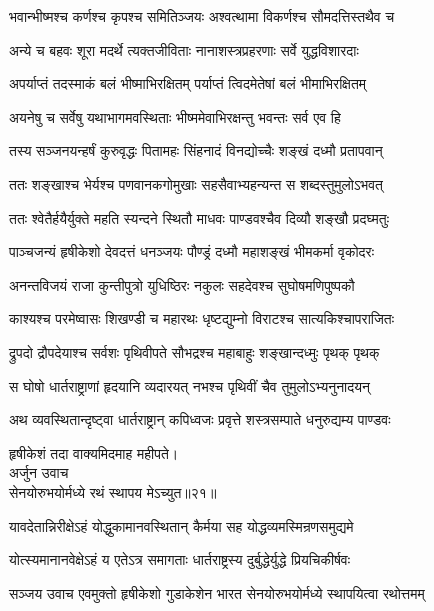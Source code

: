 \twolineshloka
{भवान्भीष्मश्च कर्णश्च कृपश्च समितिञ्जयः}
{अश्वत्थामा विकर्णश्च सौमदत्तिस्तथैव च}%

\twolineshloka
{अन्ये च बहवः शूरा मदर्थे त्यक्तजीविताः}
{नानाशस्त्रप्रहरणाः सर्वे युद्धविशारदाः}%

\twolineshloka
{अपर्याप्तं तदस्माकं बलं भीष्माभिरक्षितम्}
{पर्याप्तं त्विदमेतेषां बलं भीमाभिरक्षितम्}%

\twolineshloka
{अयनेषु च सर्वेषु यथाभागमवस्थिताः}
{भीष्ममेवाभिरक्षन्तु भवन्तः सर्व एव हि}%

\twolineshloka
{तस्य सञ्जनयन्हर्षं कुरुवृद्धः पितामहः}
{सिंहनादं विनद्योच्चैः शङ्खं दध्मौ प्रतापवान्}%

\twolineshloka
{ततः शङ्खाश्च भेर्यश्च पणवानकगोमुखाः}
{सहसैवाभ्यहन्यन्त स शब्दस्तुमुलोऽभवत्}%

\twolineshloka
{ततः श्वेतैर्हयैर्युक्ते महति स्यन्दने स्थितौ}
{माधवः पाण्डवश्चैव दिव्यौ शङ्खौ प्रदघ्मतुः}%

\twolineshloka
{पाञ्चजन्यं हृषीकेशो देवदत्तं धनञ्जयः}
{पौण्ड्रं दध्मौ महाशङ्खं भीमकर्मा वृकोदरः}%

\twolineshloka
{अनन्तविजयं राजा कुन्तीपुत्रो युधिष्ठिरः}
{नकुलः सहदेवश्च सुघोषमणिपुष्पकौ}%

\twolineshloka
{काश्यश्च परमेष्वासः शिखण्डी च महारथः}
{धृष्टद्युम्नो विराटश्च सात्यकिश्चापराजितः}%

\twolineshloka
{द्रुपदो द्रौपदेयाश्च सर्वशः पृथिवीपते}
{सौभद्रश्च महाबाहुः शङ्खान्दध्मुः पृथक् पृथक्}%

\twolineshloka
{स घोषो धार्तराष्ट्राणां हृदयानि व्यदारयत्}
{नभश्च पृथिवीं चैव तुमुलोऽभ्यनुनादयन्}%

\twolineshloka
{अथ व्यवस्थितान्दृष्ट्वा धार्तराष्ट्रान् कपिध्वजः}
{प्रवृत्ते शस्त्रसम्पाते धनुरुद्यम्य पाण्डवः}%


{हृषीकेशं तदा वाक्यमिदमाह महीपते।}\\
{अर्जुन उवाच}\\
{सेनयोरुभयोर्मध्ये रथं स्थापय मेऽच्युत॥२१॥}\\%

\twolineshloka
{यावदेतान्निरीक्षेऽहं योद्धुकामानवस्थितान्}
{कैर्मया सह योद्धव्यमस्मिन्रणसमुद्यमे}%

\twolineshloka
{योत्स्यमानानवेक्षेऽहं य एतेऽत्र समागताः}
{धार्तराष्ट्रस्य दुर्बुद्धेर्युद्धे प्रियचिकीर्षवः}%

{सञ्जय उवाच}
\twolineshloka
{एवमुक्तो हृषीकेशो गुडाकेशेन भारत}
{सेनयोरुभयोर्मध्ये स्थापयित्वा रथोत्तमम्}%

